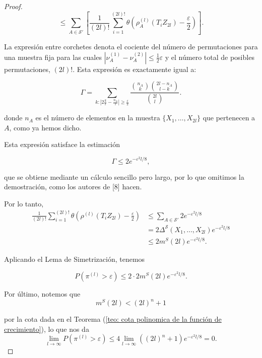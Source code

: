 \documentclass{report}
\begin{document}
\begin{proof}
\[
\leq \sum_{A \in \mathcal{S}'} \left[ \frac{1}{(2l)!} \sum_{i=1}^{(2l)!} \theta \left(  \rho^{(l)}_A(T_i Z_{2l}) - \frac{\varepsilon}{2}  \right) \right].
\]

La expresión entre corchetes denota el cociente del número de permutaciones para una muestra fija 
para las cuales \( |\nu^{(1)}_A - \nu^{(2)}_A| \leq \frac{1}{2} \varepsilon \) y el número total de posibles permutaciones, $(2l)!$. Esta expresión
es exactamente igual a:

\[
\Gamma = \sum_{k : |2\frac{k}{l} - \frac{n_A}{l}| \geq \frac{\varepsilon}{2}} \frac{\binom{n_A}{k} \binom{2l - n_A}{l - k}}{\binom{2l}{l}}.
\]

donde \( n_A \) es el número de elementos en la muestra \( \{X_1, \dots, X_{2l}\} \) que pertenecen a \( A \), como ya hemos dicho. \newline 

Esta expresión satisface la estimación 

\[
\Gamma \leq 2 e^{-\varepsilon^2 l / 8},
\]

que se obtiene mediante un cálculo sencillo pero largo, por lo que omitimos la demostración, como los autores de [8] hacen. \newline

Por lo tanto,
\begin{equation*}
\begin{aligned}
\frac{1}{(2l)!} \sum_{i=1}^{(2l)!} \theta \left(  \rho^{(l)}(T_i Z_{2l}) - \frac{\varepsilon}{2} \right) 
&\leq \sum_{A \in \mathcal{S}'} 2 e^{-\varepsilon^2 l / 8} \\
&= 2 \Delta^{\mathcal{S}}(X_1, \dots, X_{2l}) e^{-\varepsilon^2 l / 8}\\
&\leq 2 m^S(2l) e^{-\varepsilon^2 l / 8}.
\end{aligned}
\end{equation*}

Aplicando el Lema de Simetrización, tenemos

\[
P\left(\pi^{(l)}>\varepsilon\right) \leq 2 \cdot 2 m^S(2l) e^{-\varepsilon^2 l / 8}.
\]

Por último, notemos que 
\[
m^S(2l)<(2l)^n + 1
\]

por la cota dada en el Teorema (\ref{teo: cota polinomica de la función de crecimiento}), lo que nos da
\[
\lim_{l\to\infty} P\left(\pi^{(l)}>\varepsilon\right) \leq 4 \lim_{l\to\infty} ((2l)^n+1) e^{-\varepsilon^2 l / 8} = 0.
\]

\end{proof}
\end{document}
